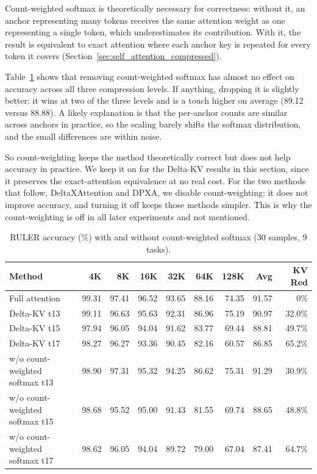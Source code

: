 Count-weighted softmax is theoretically necessary for correctness: without it, an anchor representing many tokens receives the same attention weight as one representing a single token, which underestimates its contribution. With it, the result is equivalent to exact attention where each anchor key is repeated for every token it covers (Section~\ref{sec:self_attention_compressed}).

Table~\ref{tab:ablation_count} shows that removing count-weighted softmax has almost no effect on accuracy across all three compression levels. If anything, dropping it is slightly better: it wins at two of the three levels and is a touch higher on average (89.12 versus 88.88). A likely explanation is that the per-anchor counts are similar across anchors in practice, so the scaling barely shifts the softmax distribution, and the small differences are within noise.

So count-weighting keeps the method theoretically correct but does not help accuracy in practice. We keep it on for the Delta-KV results in this section, since it preserves the exact-attention equivalence at no real cost. For the two methods that follow, DeltaXAttention and DPXA, we disable count-weighting: it does not improve accuracy, and turning it off keeps those methods simpler. This is why the count-weighting is off in all later experiments and not mentioned.

\begin{table}[!ht]
\centering
\caption{RULER accuracy (\%) with and without count-weighted softmax (30 samples, 9 tasks).}
\label{tab:ablation_count}
\begin{tabular}{lrrrrrrrr}
\toprule
Method & 4K & 8K & 16K & 32K & 64K & 128K & Avg & KV Red \\
\midrule
Full attention                 & 99.31 & 97.41 & 96.52 & 93.65 & 88.16 & 74.35 & 91.57 & 0\%    \\
\midrule
Delta-KV t13             & 99.11 & 96.63 & 95.63 & 92.31 & 86.96 & 75.19 & 90.97 & 32.0\% \\
Delta-KV t15             & 97.94 & 96.05 & 94.04 & 91.62 & 83.77 & 69.44 & 88.81 & 49.7\% \\
Delta-KV t17             & 98.27 & 96.27 & 93.36 & 90.45 & 82.16 & 60.57 & 86.85 & 65.2\% \\
\midrule
w/o count-weighted softmax t13 & 98.90 & 97.31 & 95.32 & 94.25 & 86.62 & 75.31 & 91.29 & 30.9\% \\
w/o count-weighted softmax t15 & 98.68 & 95.52 & 95.00 & 91.43 & 81.55 & 69.74 & 88.65 & 48.8\% \\
w/o count-weighted softmax t17 & 98.62 & 96.05 & 94.04 & 89.72 & 79.00 & 67.04 & 87.41 & 64.7\% \\
\bottomrule
\end{tabular}
\end{table}

